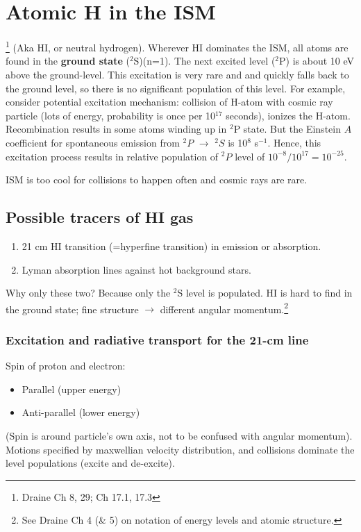 \documentclass[12pt]{article}
\newcommand{\mar}[1]{\hspace{0pt}\marginpar{-\textcolor{black}{#1}-}}
\begin{document}
\section{Atomic H in the ISM}
\footnote{Draine Ch 8, 29; Ch 17.1, 17.3}
(Aka HI, or neutral hydrogen).
Wherever HI dominates the ISM, all atoms are found in the \textbf{ground state}
($^{2}$S)(n=1). The next excited level ($^{2}$P) is about 10 eV above the
ground-level. This excitation is very rare and and quickly falls back to the
ground level, so there is no significant population of this level. For example,
consider potential excitation mechanism: collision of H-atom with cosmic ray
particle (lots of energy, probability is once per 10$^{17}$ seconds), ionizes
the H-atom. Recombination results in some atoms winding up in $^{2}$P state.
But the Einstein $A$ coefficient for spontaneous emission from $^{2}P$
$\rightarrow$ $^{2}S$ is 10$^{8}$ s$^{-1}$. Hence, this excitation process
results in relative population of $^{2}P$ level of $10^{-8}/10^{17} =
10^{-25}$.

ISM is too cool for collisions to happen often and cosmic rays are rare.

\subsection{Possible tracers of HI gas}
\begin{enumerate}
    \item 21 cm HI transition (=hyperfine transition) in emission or absorption.
    \item Lyman absorption lines against hot background stars.
\end{enumerate}
Why only these two? Because only the $^{2}$S level is populated. HI is hard to
find in the ground state; fine structure $\rightarrow$ different angular
momentum.\footnote{
    See Draine Ch 4 (\& 5) on notation of energy levels and
    atomic structure.}

\subsubsection{Excitation and radiative transport for the 21-cm line}
\mar{34}Spin of proton and electron:
\begin{itemize}
    \item Parallel (upper energy)
    \item Anti-parallel (lower energy)
\end{itemize}
(Spin is around particle's own axis, not to be confused with angular
momentum). Motions specified by maxwellian velocity distribution, and
collisions dominate the level populations (excite and de-excite).
\end{document}

